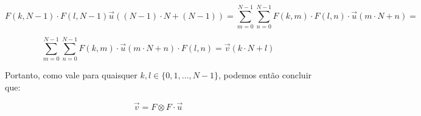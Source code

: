 \documentclass[]{abntex2}
\begin{document}
\begin{equation*}
	F(k,N-1)\cdot F(l,N-1)\vec{u}((N-1)\cdot N + (N-1)) = \sum_{m=0}^{N-1} \sum_{n=0}^{N-1} F(k,m) \cdot F(l,n) \cdot \vec{u}(m\cdot N+n) = 
\end{equation*}

\begin{equation*}
	\sum_{m=0}^{N-1} \sum_{n=0}^{N-1} F(k,m) \cdot \vec{u}(m\cdot N+n) \cdot F(l,n) =  \vec{v}(k\cdot N + l)
\end{equation*}

Portanto, como vale para quaisquer $k,l \in \{0,1,\ldots, N-1\}$, podemos então concluir que:

\begin{tcolorbox}
\[
	\vec{v} = F\otimes F \cdot \vec{u}
\]
\end{tcolorbox}
\end{document}
